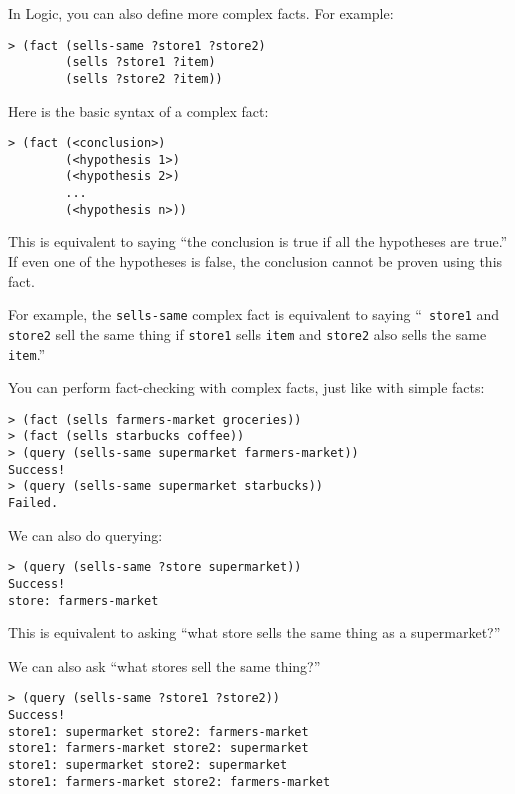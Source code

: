 In Logic, you can also define more complex facts. For example:

\begin{lstlisting}
> (fact (sells-same ?store1 ?store2)
        (sells ?store1 ?item)
        (sells ?store2 ?item))
\end{lstlisting}

Here is the basic syntax of a complex fact:

\begin{lstlisting}
> (fact (<conclusion>)
        (<hypothesis 1>)
        (<hypothesis 2>)
        ...
        (<hypothesis n>))
\end{lstlisting}

This is equivalent to saying ``the conclusion is true if all the hypotheses are
true.''  If even one of the hypotheses is false, the conclusion cannot be proven
using this fact.

For example, the {\tt sells-same} complex fact is equivalent to saying ``{\tt
store1} and {\tt store2} sell the same thing if {\tt store1} sells {\tt item}
and {\tt store2} also sells the same {\tt item}.''

You can perform fact-checking with complex facts, just like with simple facts:

\begin{lstlisting}
> (fact (sells farmers-market groceries))
> (fact (sells starbucks coffee))
> (query (sells-same supermarket farmers-market))
Success!
> (query (sells-same supermarket starbucks))
Failed.
\end{lstlisting}

We can also do querying:

\begin{lstlisting}
> (query (sells-same ?store supermarket))
Success!
store: farmers-market
\end{lstlisting}

This is equivalent to asking ``what store sells the same thing as a
supermarket?''

We can also ask ``what stores sell the same thing?''

\begin{lstlisting}
> (query (sells-same ?store1 ?store2))
Success!
store1: supermarket store2: farmers-market
store1: farmers-market store2: supermarket
store1: supermarket store2: supermarket
store1: farmers-market store2: farmers-market
\end{lstlisting}

